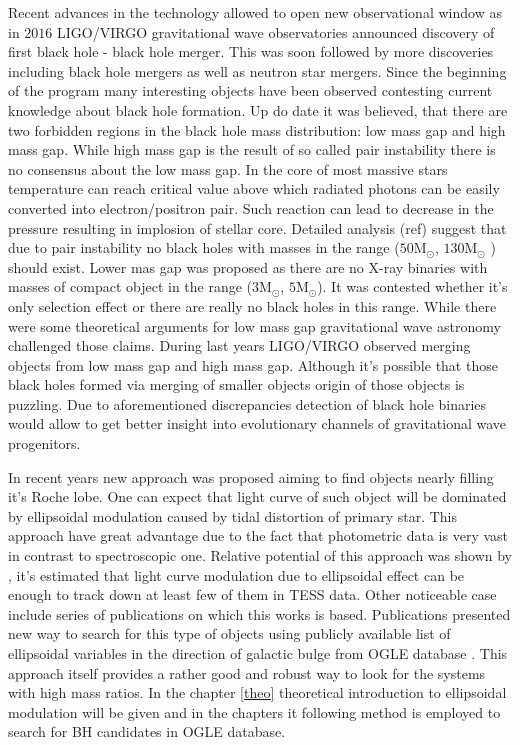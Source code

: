 \documentclass{pracalicmgr}
\begin{document}
\hspace{1cm} Recent advances in the technology allowed to open new observational window as in $2016$ LIGO/VIRGO gravitational wave observatories 
announced discovery of first black hole - black hole merger. This was soon followed by more discoveries including  black hole mergers as 
well as neutron star mergers. Since the beginning of the program many interesting objects have been observed contesting current knowledge 
about black hole formation. Up do date it was believed, that there are two forbidden regions in the black hole mass distribution:
low mass gap and high mass gap. While high mass gap is the result of so called pair instability there is no consensus about the low mass gap.
In the core of most massive stars temperature can reach critical value above which radiated photons can be easily converted into electron/positron pair. Such 
reaction can lead to decrease in the pressure resulting in implosion of stellar core. Detailed analysis (ref) suggest that due to pair instability 
no black holes with masses in the range ($50 \textrm{M}_{\odot}$, $ 130 \textrm{M}_{\odot}$ ) should exist. Lower mas gap was proposed as there 
are no X-ray binaries with masses of compact object in the range ($3 \textrm{M}_{\odot}$, $5 \textrm{M}_{\odot}$). It was contested whether it's only
selection effect or there are really no black holes in this range. While there were some theoretical arguments for low mass gap \citep{belczynski_missing_2012}
gravitational wave astronomy challenged those claims. During last years LIGO/VIRGO observed merging objects from low mass gap and high mass gap. Although
it's possible that those black holes formed via merging of smaller objects origin of those objects is puzzling. 
Due to aforementioned discrepancies detection of black hole binaries would allow to get better insight into evolutionary channels 
of gravitational wave progenitors.

\hspace{1cm} In recent years new approach was proposed aiming to find objects nearly filling it's Roche lobe. One can expect that light curve of such object 
will be dominated by ellipsoidal modulation caused by tidal distortion of primary star. This approach have great advantage due to the fact that photometric data is very vast in contrast to spectroscopic one.
Relative potential of this approach was shown by \citep{masuda_prospects_2019}, it's estimated that light curve modulation due to ellipsoidal effect can be enough to track down
at least few of them in TESS data. Other noticeable case include series of publications \citep{gomel_search_2021,gomel_search_2021-1,gomel_search_2021-2} on which this works is based.
Publications presented new way to search for this type of objects using publicly available list of ellipsoidal variables in the direction of galactic bulge from OGLE database
 \citep{soszynski_ogle_2016}. This approach itself provides a rather good and robust way to look for the systems with high mass ratios. In the chapter \ref{theo} theoretical
introduction to ellipsoidal modulation will be given and in the chapters it following method is employed to search for BH candidates in OGLE database.
\end{document}

